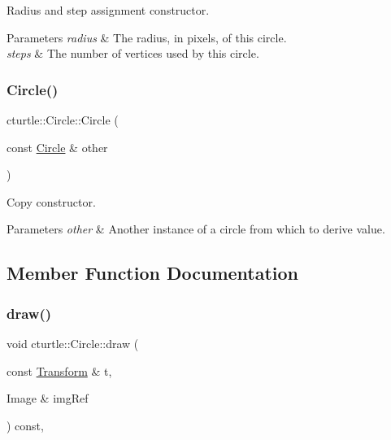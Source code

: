 Radius and step assignment constructor. 


\begin{DoxyParams}{Parameters}
{\em radius} & The radius, in pixels, of this circle. \\
\hline
{\em steps} & The number of vertices used by this circle. \\
\hline
\end{DoxyParams}
\mbox{\label{classcturtle_1_1Circle_a2a74f8664da6643f8327c2fa49659cdd}} 
\subsubsection{\texorpdfstring{Circle()}{Circle()}\hspace{0.1cm}{\footnotesize\ttfamily [2/2]}}
{\footnotesize\ttfamily cturtle\+::\+Circle\+::\+Circle (\begin{DoxyParamCaption}\item[{const \hyperlink{classcturtle_1_1Circle}{Circle} \&}]{other }\end{DoxyParamCaption})\hspace{0.3cm}{\ttfamily [inline]}}



Copy constructor. 


\begin{DoxyParams}{Parameters}
{\em other} & Another instance of a circle from which to derive value. \\
\hline
\end{DoxyParams}


\subsection{Member Function Documentation}
\mbox{\label{classcturtle_1_1Circle_a7c95f8f4d126e38661e4ee94be58a8c4}} 
\subsubsection{\texorpdfstring{draw()}{draw()}}
{\footnotesize\ttfamily void cturtle\+::\+Circle\+::draw (\begin{DoxyParamCaption}\item[{const \hyperlink{classcturtle_1_1Transform}{Transform} \&}]{t,  }\item[{Image \&}]{img\+Ref }\end{DoxyParamCaption}) const\hspace{0.3cm}{\ttfamily [inline]}, {\ttfamily [virtual]}}



